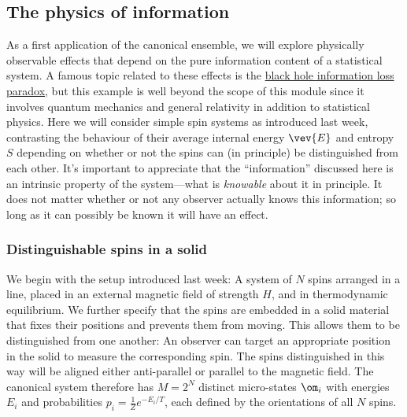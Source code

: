 \subsection{\label{sec:spin_info}The physics of information}
As a first application of the canonical ensemble, we will explore physically observable effects that depend on the pure information content of a statistical system.
A famous topic related to these effects is the \href{https://en.wikipedia.org/wiki/Black_hole_information_paradox}{black hole information loss paradox}, but this example is well beyond the scope of this module since it involves quantum mechanics and general relativity in addition to statistical physics.
Here we will consider simple spin systems as introduced last week, contrasting the behaviour of their average internal energy $\vev{E}$ and entropy $S$ depending on whether or not the spins can (in principle) be distinguished from each other.
It's important to appreciate that the ``information'' discussed here is an intrinsic property of the system---what is \textit{knowable} about it in principle.
It does not matter whether or not any observer actually knows this information; so long as it can possibly be known it will have an effect.

\subsubsection{\label{sec:spin_chain}Distinguishable spins in a solid}
We begin with the setup introduced last week: A system of $N$ spins arranged in a line, placed in an external magnetic field of strength $H$, and in thermodynamic equilibrium.
We further specify that the spins are embedded in a solid material that fixes their positions and prevents them from moving.
This allows them to be distinguished from one another: An observer can target an appropriate position in the solid to measure the corresponding spin.
The spins distinguished in this way will be aligned either anti-parallel or parallel to the magnetic field.
The canonical system therefore has $M = 2^N$ distinct micro-states $\om_i$ with energies $E_i$ and probabilities $p_i = \frac{1}{Z} e^{-E_i / T}$, each defined by the orientations of all $N$ spins.

